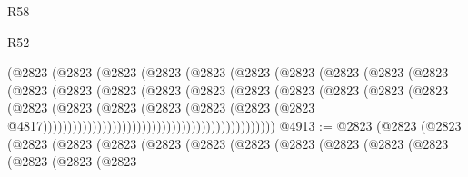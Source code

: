 \begin{lexlean}{R58}
\begin{lexlean}{R52}
\begin{coremodule}
{{{{{{{{{{{{{{{{{{{{{{{{{{{{{{{{{{{{{{{{{{{{{{{{{{{{{{{{{{{{{{{{{{{{{{{{{{{{{{{{{{{{{{{{{{{{{{{{{{{{{{{{{{{{{{{{{{{{{{{{{{{{{{{{{{{{{{{{{{{{{{{{{{{{{{{{{{{{{{{{{{{{{{{{{{{{{{{{{{{{{{{{{{{{{{{{{{{{{{                                            (@2823
                                              (@2823
                                                (@2823
                                                  (@2823
                                                    (@2823
                                                      (@2823
                                                        (@2823
                                                          (@2823
                                                            (@2823
                                                              (@2823
                                                                (@2823
                                                                  (@2823
                                                                    (@2823
                                                                      (@2823
                                                                        (@2823
                                                                          (@2823
                                                                            (@2823
                                                                              (@2823
                                                                                (@2823
                                                                                  (@2823
                                                                                    (@2823
                                                                                      (@2823
                                                                                        (@2823
                                                                                          (@2823
                                                                                            (@2823
                                                                                              (@2823
                                                                                                (@2823
                                                                                                  @4817)))))))))))))))))))))))))))))))))))))))))))))))
@4913 := @2823
    (@2823
      (@2823
        (@2823
          (@2823
            (@2823
              (@2823
                (@2823
                  (@2823
                    (@2823
                      (@2823
                        (@2823
                          (@2823
                            (@2823
                              (@2823
                                (@2823
}}}}}}}}}}}}}}}}}}}}}}}}}}}}}}}}}}}}}}}}}}}}}}}}}}}}}}}}}}}}}}}}}}}}}}}}}}}}}}}}}}}}}}}}}}}}}}}}}}}}}}}}}}}}}}}}}}}}}}}}}}}}}}}}}}}}}}}}}}}}}}}}}}}}}}}}}}}}}}}}}}}}}}}}}}}}}}}}}}}}}}}}}}}}}}}}}}}}}}
\end{coremodule}
\end{lexlean}
\end{lexlean}
